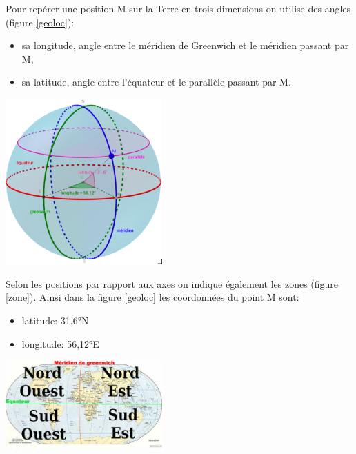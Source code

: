 \documentclass[a4paper,11pt]{article}
\begin{document}
Pour repérer une position M sur la Terre en trois dimensions on utilise des angles (figure \ref{geoloc}):
\begin{itemize}
    \item sa longitude, angle entre le méridien de Greenwich et le méridien passant par M,
    \item sa latitude, angle entre l’équateur et le parallèle passant par M.
\end{itemize}
\begin{center}
    \centering
    \includegraphics[width=6cm]{ressources/geoloc.png}
    \label{geoloc}
\end{center}
Selon les positions par rapport aux axes on indique également les zones (figure \ref{zone}). Ainsi dans la figure \ref{geoloc} les coordonnées du point M sont:
\begin{itemize}
    \item latitude: 31,6°N
    \item longitude: 56,12°E
\end{itemize}
\begin{center}
    \centering
    \includegraphics[width=6cm]{ressources/zone.png}
    \label{zone}
\end{center}
\end{document}
